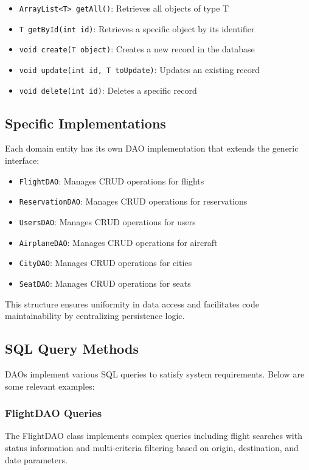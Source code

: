 \documentclass[conference]{IEEEtran}
\begin{document}
    \begin{itemize}
        \item \texttt{ArrayList<T> getAll()}: Retrieves all objects of type T
        \item \texttt{T getById(int id)}: Retrieves a specific object by its identifier
        \item \texttt{void create(T object)}: Creates a new record in the database
        \item \texttt{void update(int id, T toUpdate)}: Updates an existing record
        \item \texttt{void delete(int id)}: Deletes a specific record
    \end{itemize}

    \subsection{Specific Implementations}
    Each domain entity has its own DAO implementation that extends the generic interface:

    \begin{itemize}
        \item \texttt{FlightDAO}: Manages CRUD operations for flights
        \item \texttt{ReservationDAO}: Manages CRUD operations for reservations
        \item \texttt{UsersDAO}: Manages CRUD operations for users
        \item \texttt{AirplaneDAO}: Manages CRUD operations for aircraft
        \item \texttt{CityDAO}: Manages CRUD operations for cities
        \item \texttt{SeatDAO}: Manages CRUD operations for seats
    \end{itemize}

    This structure ensures uniformity in data access and facilitates code maintainability by centralizing persistence logic.

    \subsection{SQL Query Methods}
    DAOs implement various SQL queries to satisfy system requirements. Below are some relevant examples:

    \subsubsection{FlightDAO Queries}
    The FlightDAO class implements complex queries including flight searches with status information and multi-criteria filtering based on origin, destination, and date parameters.
\end{document}

